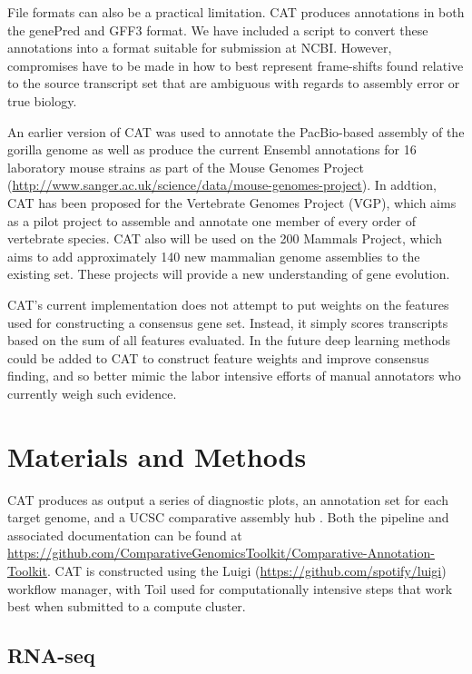 \documentclass[fleqn,10pt]{wlscirep}
\begin{document}
File formats can also be a practical limitation. CAT produces annotations in both the genePred and GFF3 format. We have included a script to convert these annotations into a format suitable for submission at NCBI. However, compromises have to be made in how to best represent frame-shifts found relative to the source transcript set that are ambiguous with regards to assembly error or true biology.

An earlier version of CAT was used to annotate the PacBio-based assembly of the gorilla genome \cite{gordon2016long} as well as produce the current Ensembl annotations for 16 laboratory mouse strains as part of the Mouse Genomes Project (\url{http://www.sanger.ac.uk/science/data/mouse-genomes-project}). In addtion, CAT has been proposed for the Vertebrate Genomes Project (VGP), which aims as a pilot project to assemble and annotate one member of every order of vertebrate species. CAT also will be used on the 200 Mammals Project, which aims to add approximately 140 new mammalian genome assemblies to the existing set. These projects will provide a new understanding of gene evolution.

CAT’s current implementation does not attempt to put weights on the features used for constructing a consensus gene set. Instead, it simply scores transcripts based on the sum of all features evaluated. In the future deep learning methods could be added to CAT to construct feature weights and improve consensus finding, and so better mimic the labor intensive efforts of manual annotators who currently weigh such evidence.

\section*{Materials and Methods}
CAT produces as output a series of diagnostic plots, an annotation set for each target genome, and a UCSC comparative assembly hub \cite{nguyen2014comparative}. Both the pipeline and associated documentation can be found at \url{https://github.com/ComparativeGenomicsToolkit/Comparative-Annotation-Toolkit}. CAT is constructed using the Luigi (\url{https://github.com/spotify/luigi}) workflow manager, with Toil \cite{vivian2017toil} used for computationally intensive steps that work best when submitted to a compute cluster. 

\subsection*{RNA-seq}
\end{document}
